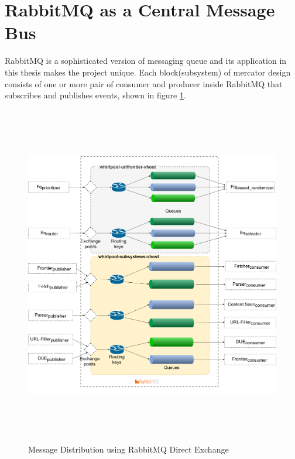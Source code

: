 \section{RabbitMQ as a Central Message Bus}\label{internals}
RabbitMQ is a sophisticated version of messaging queue and its application in this thesis makes the
project unique. Each block(subsystem) of mercator design consists of one or more pair of consumer and producer inside RabbitMQ that subscribes and publishes events, shown in figure \ref{fig:rmq}.
\begin{figure}[h!]
  \centering
  \includegraphics[width=20cm,height=15cm,keepaspectratio]{../media/crawler/rmq-broker.png}
  \caption{Message Distribution using RabbitMQ Direct Exchange}
  \label{fig:rmq}
\end{figure}

